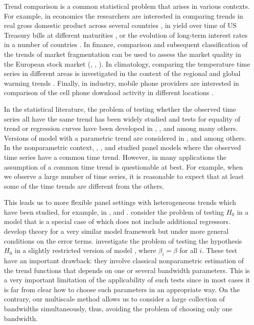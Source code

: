 \documentclass[a4paper,12pt]{article}
\makeatletter
\renewcommand{\eqref}[1]{\tagform@{\ref{#1}}}
\makeatother
\begin{document}
Trend comparison is a common statistical problem that arises in various contexts. For example, in economics the researchers are interested in comparing trends in real gross domestic product across several countries \citep[][]{Grier1989}, in yield over time of US Treasury bills at different maturities \citep[][]{Park2009}, or the evolution of long-term interest rates in a number of countries \citep[][]{Christiansen1997}. In finance, comparison and subsequent classification of the trends of market fragmentation can be used to assess the market quality in the European stock market (\citeauthor{VogtLinton2017}, \citeyear{VogtLinton2017}, \citeyear{VogtLinton2020}). In climatology, comparing the temperature time series in different areas is investigated in the context of the regional and global warming trends   \citep[][]{KarolyWu2005}. Finally, in industry, mobile phone providers are interested in comparison of the cell phone download activity in different locations \citep[][]{DegrasWu2012}.


In the statistical literature, the problem of testing whether the observed time series all have the same trend  has been widely studied and tests for equality of trend or regression curves have been developed in \cite{HaerdleMarron1990}, \cite{Hall1990}, \cite{Delgado1993} and \cite{DegrasWu2012} among many others. Versions of \linebreak model \eqref{eq:model} with a parametric trend are considered in \cite{Vogelsang2005}, \cite{Sun2011} and \cite{Xu2012} among others. In the nonparametric context, \cite{LiChenGao2010}, \cite{Atak2011}, \cite{Robinson2012} and \cite{ChenGaoLi2012} studied panel models where the observed time series have a common time trend. However, in many applications the assumption of a common time trend is questionable at best. For example, when we observe a large number of time series, it is reasonable to expect that at least some of the time trends are different from the others. 

This leads us to more flexible panel settings with heterogeneous trends which have been studied, for example, in \cite{DegrasWu2012},  \cite{Zhang2012} and \cite{Hidalgo2014}. \cite{DegrasWu2012} consider the problem of testing $H_0$ in a model that is a special case of \eqref{eq:model} which does not include additional regressors. \cite{ChenWu2018} develop theory for a very similar model framework but under more general conditions on the error terms. \cite{Zhang2012} investigate the problem of testing the hypothesis $H_0$ in a slightly restricted version of model \eqref{eq:model}, where $\beta_i = \beta$ for all $i$. These test have an important drawback: they involve classical nonparametric estimation of the trend functions that depends on one or several bandwidth parameters. This is a very important limitation of the applicability of such tests since in most cases it is far from clear how to choose such parameters in an appropriate way. On the contrary, our multiscale method allows us to consider a large collection of bandwidths simultaneously, thus, avoiding the problem of choosing only one bandwidth.
\end{document}
